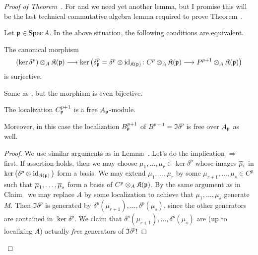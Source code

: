\documentclass[a4paper,parskip=half,numbers=enddot, DIV=12]{scrreprt}
\begin{document}
\begin{proof}[Proof of Theorem~]
	For  and  we need yet another lemma, but I promise this will be the last technical commutative algebra lemma required to prove Theorem~.
	\begin{lem}
		Let $\mathfrak{p}\in \operatorname{Spec} A$. In the above situation, the following conditions are equivalent.
		\begin{alphanumerate}
			\item The canonical morphism
			\begin{align*}
				(\ker\delta^p)\otimes_A\KK(\pp)\morphism\ker\left(\delta^p_\pp=\delta^p\otimes \id_{\KK(\pp)}\colon C^p\otimes_A\KK(\pp)\morphism P^{p+1}\otimes_A\KK(\pp)\right)
			\end{align*}
			is surjective.
			\item Same as , but the morphism is even bijective.
			\item The localization $C^{p+1}_{\mathfrak{p}}$ is a free $A_{\mathfrak{p}}$-module.
		\end{alphanumerate}
		Moreover, in this case the localization $B^{p+1}_{\mathfrak{p}}$ of $B^{p+1}=\Im\delta^p$ is free over $A_{\mathfrak{p}}$ as well.
	\end{lem}
\begin{proof}
	We use similar arguments as in Lemma~. Let's do the implication  $\Rightarrow$  first. If assertion  holds, then we may choose $\mu_1,\ldots,\mu_r\in\ker \delta^p$ whose images $\overline{\mu}_i$ in $\ker\big(\delta^p\otimes\operatorname{id}_{\mathfrak{K}(\mathfrak{p})}\big)$ form a basis. We may extend $\mu_1,\ldots,\mu_r$ by some $\mu_{r+1},\ldots,\mu_s\in C^p$ such that $\overline{\mu}_1,\ldots,\overline{\mu}_s$ form a basis of $C^p\otimes_A\mathfrak{K}(\mathfrak{p})$. By the same argument as in Claim~ we may replace $A$ by some localization to achieve that $\mu_1,\ldots,\mu_s$ generate $M$. Then $\Im \delta^p$ is generated by $\delta^p(\mu_{r+1}),\ldots,\delta^p(\mu_s)$, since the other generators are contained in $\ker \delta^p$. We claim that $\delta^p(\mu_{r+1}),\ldots,\delta^p(\mu_s)$ are (up to localizing $A$) actually \emph{free} generators of $\Im\delta^p$!
	

\end{proof}
\end{proof}
\end{document}
